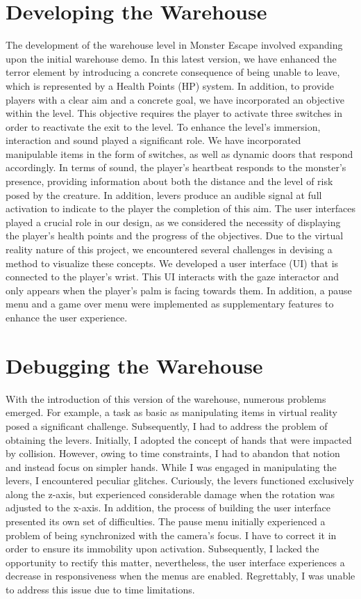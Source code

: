 \documentclass{vgtc}                          %
\begin{document}
\section{Developing the Warehouse}
The development of the warehouse level in Monster Escape involved expanding upon the initial warehouse demo. In this latest version, we have enhanced the terror element by introducing a concrete consequence of being unable to leave, which is represented by a Health Points (HP) system. In addition, to provide players with a clear aim and a concrete goal, we have incorporated an objective within the level. This objective requires the player to activate three switches in order to reactivate the exit to the level. To enhance the level's immersion, interaction and sound played a significant role. We have incorporated manipulable items in the form of switches, as well as dynamic doors that respond accordingly. In terms of sound, the player's heartbeat responds to the monster's presence, providing information about both the distance and the level of risk posed by the creature. In addition, levers produce an audible signal at full activation to indicate to the player the completion of this aim. The user interfaces played a crucial role in our design, as we considered the necessity of displaying the player's health points and the progress of the objectives. Due to the virtual reality nature of this project, we encountered several challenges in devising a method to visualize these concepts. We developed a user interface (UI) that is connected to the player's wrist. This UI interacts with the gaze interactor and only appears when the player's palm is facing towards them. In addition, a pause menu and a game over menu were implemented as supplementary features to enhance the user experience.

\section{Debugging the Warehouse}
With the introduction of this version of the warehouse, numerous problems emerged. For example, a task as basic as manipulating items in virtual reality posed a significant challenge. Subsequently, I had to address the problem of obtaining the levers. Initially, I adopted the concept of hands that were impacted by collision. However, owing to time constraints, I had to abandon that notion and instead focus on simpler hands. While I was engaged in manipulating the levers, I encountered peculiar glitches. Curiously, the levers functioned exclusively along the z-axis, but experienced considerable damage when the rotation was adjusted to the x-axis. In addition, the process of building the user interface presented its own set of difficulties. The pause menu initially experienced a problem of being synchronized with the camera's focus. I have to correct it in order to ensure its immobility upon activation. Subsequently, I lacked the opportunity to rectify this matter, nevertheless, the user interface experiences a decrease in responsiveness when the menus are enabled. Regrettably, I was unable to address this issue due to time limitations.
\end{document}
